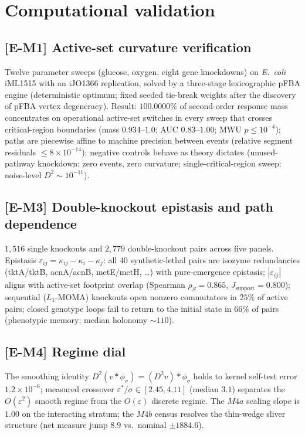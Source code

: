 \documentclass[11pt,a4paper]{article}
\theoremstyle{plain}
\theoremstyle{definition}
\theoremstyle{remark}
\begin{document}
\section{Computational validation}\label{sec:computational}


\subsection{[E-M1] Active-set curvature verification}
Twelve parameter sweeps (glucose, oxygen, eight gene knockdowns) on
\emph{E.~coli} iML1515 with an iJO1366 replication, solved by a
three-stage lexicographic pFBA engine (deterministic optimum; fixed seeded
tie-break weights after the discovery of pFBA vertex degeneracy).
Result: $100.0000\%$ of second-order response mass concentrates on
operational active-set switches in every sweep that crosses
critical-region boundaries (mass $0.934$--$1.0$; AUC $0.83$--$1.00$;
MWU $p \le 10^{-4}$); paths are piecewise affine to machine precision
between events (relative segment residuals $\le 8 \times 10^{-14}$);
negative controls behave as theory dictates (unused-pathway knockdown:
zero events, zero curvature; single-critical-region sweep: noise-level
$D^2 \sim 10^{-11}$).

\subsection{[E-M3] Double-knockout epistasis and path dependence}
$1{,}516$ single knockouts and $2{,}779$ double-knockout pairs across five
panels. Epistasis $\varepsilon_{ij} = \kappa_{ij} - \kappa_i - \kappa_j$:
all $40$ synthetic-lethal pairs are isozyme redundancies
(tktA/tktB, acnA/acnB, metE/metH, \dots) with pure-emergence epistasis;
$|\varepsilon_{ij}|$ aligns with active-set footprint overlap
(Spearman $\rho_S = 0.865$, $J_{\mathrm{support}} = 0.800$); sequential
($L_1$-MOMA) knockouts open nonzero commutators in $25\%$ of active pairs;
closed genotype loops fail to return to the initial state in $66\%$ of
pairs (phenotypic memory; median holonomy $\sim 110$).

\subsection{[E-M4] Regime dial}
\label{sec:m4}
The smoothing identity $D^2(v * \phi_\sigma) = (D^2 v) * \phi_\sigma$
holds to kernel self-test error $1.2 \times 10^{-6}$; measured crossover
$\varepsilon^*/\sigma \in [2.45, 4.11]$ (median $3.1$) separates the
$O(\varepsilon^2)$ smooth regime from the $O(\varepsilon)$ discrete
regime. The $M4a$ scaling slope is $1.00$ on the interacting stratum;
the $M4b$ census resolves the thin-wedge sliver structure
(net measure jump $8.9$ vs.\ nominal $\pm 1884.6$).
\end{document}
